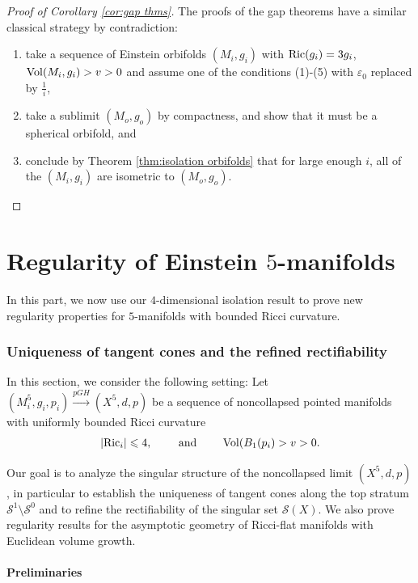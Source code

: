 \documentclass[11pt,reqno]{amsart}
\numberwithin{equation}{section}
\newcommand{\Ric}{{\rm Ric}}
\newcommand{\Vol}{{\rm Vol}}
\newcommand{\cS}{\mathcal{S}}
\theoremstyle{definition}
\theoremstyle{remark}
\begin{document}
\begin{proof}[Proof of Corollary \ref{cor:gap thms}]
    
 The proofs of the gap theorems have a similar classical strategy by contradiction:
\begin{enumerate}
 \item take a sequence of Einstein orbifolds $(M_i,g_i)$ with $\Ric(g_i) = 3g_i$, $\Vol(M_i,g_i)>v>0$ and assume one of the conditions (1)-(5) with $\varepsilon_0$ replaced by $\frac{1}{i}$,
 \item take a sublimit $(M_o,g_o)$ by compactness, and show that it must be a spherical orbifold, and
 \item conclude by Theorem \ref{thm:isolation orbifolds} that for large enough $i$, all of the $(M_i,g_i)$ are isometric to $(M_o,g_o)$.
\end{enumerate}
\end{proof}




\part{Regularity of Einstein $5$-manifolds}

In this part, we now use our $4$-dimensional isolation result to prove new regularity properties for $5$-manifolds with bounded Ricci curvature.


\section{Uniqueness of tangent cones and the refined rectifiability}

In this section, we consider the following setting: Let $(M^5_i, g_i, p_i) \xrightarrow{pGH} (X^5,d,p)$ be a sequence of noncollapsed pointed manifolds with uniformly bounded Ricci curvature
\begin{align*}
    |\Ric_i | \leqslant 4, \qquad \text{ and }\qquad
    \Vol(B_1(p_i) > v >0.
\end{align*}

Our goal is to analyze the singular structure of the noncollapsed limit $(X^5,d,p)$, in particular to establish the uniqueness of tangent cones along the top stratum $\cS^1\setminus\cS^0$ and to refine the rectifiability of the singular set $\cS(X)$. We also prove regularity results for the asymptotic geometry of Ricci-flat manifolds with Euclidean volume growth.

\subsection{Preliminaries}
\end{document}
